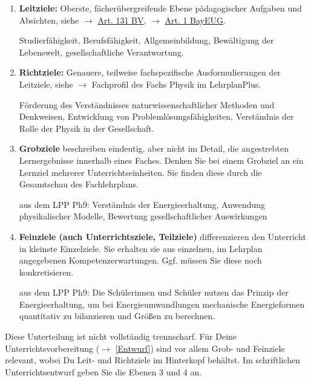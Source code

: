 \begin{enumerate}
	\item \textbf{Leitziele:} Oberste, fächerübergreifende Ebene pädagogischer Aufgaben und Absichten, siehe $\to$ \href{https://www.gesetze-bayern.de/Content/Document/BayVerf-131}{Art. 131 BV}, $\to$ \href{https://www.gesetze-bayern.de/Content/Document/BayEUG-1}{Art. 1 BayEUG}.
	\begin{beisp2}
		Studierf\"{a}higkeit, Berufsf\"{a}higkeit, Allgemeinbildung, Bew\"{a}ltigung der Lebenswelt, gesellschaftliche Verantwortung.
	\end{beisp2}

	\item \textbf{Richtziele:} Genauere, teilweise fachspezifische Ausformulierungen der Leitziele, siehe $\to$ Fachprofil des Fachs Physik im LehrplanPlus.
	\begin{beisp2}
		Förderung des Verständnisses naturwissenschaftlicher Methoden und Denkweisen, Entwicklung von Problemlösungsfähigkeiten, Verständnis der Rolle der Physik in der Gesellschaft.
	\end{beisp2}


	\item \textbf{Grobziele} beschreiben eindeutig, aber nicht im Detail, die angestrebten Lernergebnisse innerhalb eines Faches. Denken Sie bei einem Grobziel an ein Lernziel mehrerer Unterrichtseinheiten. Sie finden diese durch die Gesamtschau des Fachlehrplans.

	\begin{beisp2}
		aus dem LPP Ph9: Verständnis der Energieerhaltung, Anwendung physikalischer Modelle, Bewertung gesellschaftlicher Auswirkungen
	\end{beisp2}

	\item \textbf{Feinziele (auch Unterrichtsziele, Teilziele)} differenzieren den Unterricht in kleinste Einzelziele. Sie erhalten sie aus einzelnen, im Lehrplan angegebenen Kompetenzerwartungen. Ggf. müssen Sie diese noch konkretisieren.

	\begin{beisp2}
		aus dem LPP Ph9: Die Schülerinnen und Schüler nutzen das Prinzip der Energieerhaltung, um bei Energieumwandlungen mechanische Energieformen quantitativ zu bilanzieren und Größen zu berechnen.
	\end{beisp2}
\end{enumerate}

Diese Unterteilung ist nicht vollständig trennscharf. Für Deine Unterrichtsvorbereitung ($\to$ \cref{Entwurf}) sind vor allem Grob- und Feinziele relevant, wobei Du Leit- und Richtziele im Hinterkopf behältst. Im schriftlichen Unterrichtsentwurf geben Sie die Ebenen 3 und 4 an.

